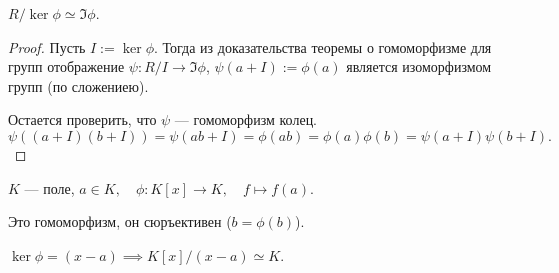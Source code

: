 \begin{theorem}
    $R / \ker \phi \simeq \Im \phi$.
\end{theorem}

\begin{proof}
    Пусть $I := \ker \phi$. Тогда из доказательства теоремы о гомоморфизме для групп отображение $\psi \colon R / I \to \Im \phi$, $\psi(a + I) := \phi(a)$ является изоморфизмом групп (по сложениею).

    Остается проверить, что $\psi$ --- гомоморфизм колец.
    \begin{equation*}
        \psi((a + I)(b + I)) = \psi(ab + I) = \phi(ab) = \phi(a)\phi(b) = \psi(a + I) \psi(b + I)
    .\end{equation*}
\end{proof}

\begin{example}
    $K$ --- поле, $a \in K, \quad \phi \colon K[x] \to K, \quad f \mapsto f(a)$.

    Это гомоморфизм, он сюръективен ($b = \phi(b)$).

    $\ker \phi = (x - a) \implies K[x] / (x - a) \simeq K$.
\end{example}
